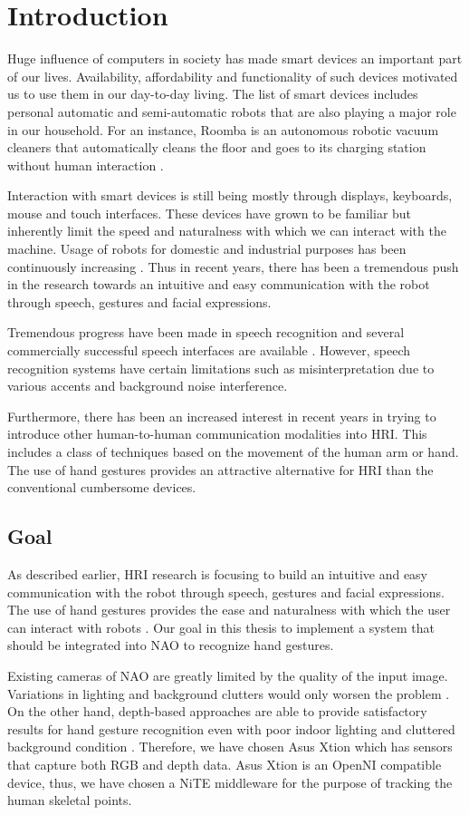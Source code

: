 \chapter{Introduction} Huge influence of computers in society has made smart devices an important part of our lives. Availability, affordability and functionality of such devices motivated us to use them in our day-to-day living. The list of smart devices includes personal automatic and semi-automatic robots that are also playing a major role in our household. For an instance, Roomba is an autonomous robotic vacuum cleaners that automatically cleans the floor and goes to its charging station without human interaction \cite{4}.

Interaction with smart devices is still being mostly through displays, keyboards, mouse and touch interfaces. These devices have grown to be familiar but inherently limit the speed and naturalness with which we can interact with the machine. Usage of robots for domestic and industrial purposes has been continuously increasing \cite{5}. Thus in recent years, there has been a tremendous push in the research towards an intuitive and easy communication with the robot through speech, gestures and facial expressions.

Tremendous progress have been made in speech recognition and several commercially successful speech interfaces are available \cite{6}. However, speech recognition systems have certain limitations such as misinterpretation due to various accents and background noise interference.

Furthermore, there has been an increased interest in recent years in trying to introduce other human-to-human communication modalities into HRI. This includes a class of techniques based on the movement of the human arm or hand. The use of hand gestures provides an attractive alternative for HRI than the conventional cumbersome devices.


\section{Goal} As described earlier, HRI research is focusing to build an intuitive and easy communication with the robot through speech, gestures and facial expressions. The use of hand gestures provides the ease and naturalness with which the user can interact with robots \cite{1}. Our goal in this thesis to implement a system that should be integrated into NAO to recognize hand gestures. 

Existing cameras of NAO are greatly limited by the quality of the input image. Variations in lighting and background clutters would only worsen the problem \cite{17}. On the other hand, depth-based approaches are able to provide satisfactory results for hand gesture recognition even with poor indoor lighting and cluttered background condition \cite{18}. Therefore, we have chosen Asus Xtion which has sensors that capture both RGB and depth data. Asus Xtion is an OpenNI compatible device, thus, we have chosen a NiTE middleware for the purpose of tracking the human skeletal points. 


